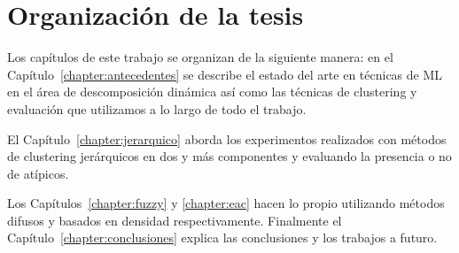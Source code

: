 \section{Organización de la tesis}

Los capítulos de este trabajo se organizan de la siguiente manera: en el Capítulo~\ref{chapter:antecedentes} se describe el estado del arte en técnicas de \gls{ML} en el área de descomposición dinámica así como las técnicas de clustering y evaluación que utilizamos a lo largo de todo el trabajo. 

El Capítulo~\ref{chapter:jerarquico} aborda los experimentos realizados con métodos de clustering jerárquicos en dos y más componentes y evaluando la presencia o no de atípicos.

Los Capítulos~\ref{chapter:fuzzy} y \ref{chapter:eac} hacen lo propio utilizando métodos difusos y basados en densidad respectivamente. Finalmente el Capítulo~\ref{chapter:conclusiones} explica las conclusiones y los trabajos a futuro.